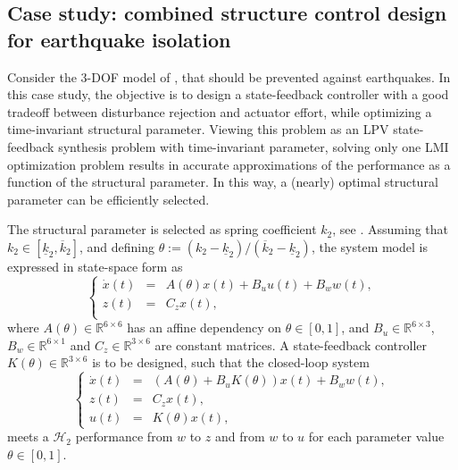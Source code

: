 \documentclass{article}
\newcommand{\ppar}{\theta}                          %
\begin{document}
\subsection{Case study: combined structure control design for earthquake isolation}
Consider the 3-DOF model of \cite{Camino_2003}, that should be prevented against earthquakes. In this case study, the objective is to design a state-feedback controller with a good tradeoff between disturbance rejection and actuator effort, while optimizing a time-invariant structural parameter. Viewing this problem as an LPV state-feedback synthesis problem with time-invariant parameter, solving only one LMI optimization problem results in accurate approximations of the performance as a function of the structural parameter. In this way, a (nearly) optimal structural parameter can be efficiently selected.

The structural parameter is selected as spring coefficient $k_2$, see \cite{Camino_2003}. Assuming that $k_2 \in [\underline{k}_2, \overline{k}_2]$, and defining $\ppar := (k_2 - \underline{k}_2)/(\overline{k}_2 - \underline{k}_2)$, the system model is expressed in state-space form as
\begin{equation*}
\left\{ \begin{array}{rcl}
	\dot{x}(t) & = & A(\ppar)x(t) + B_u u(t) + B_w w(t), \\
	z(t) & = & C_z x(t), \\
\end{array} \right.
\end{equation*}
where $A(\ppar) \in \mathbb{R}^{6 \times 6}$ has an affine dependency on $\ppar \in [0,1]$, and $B_u \in \mathbb{R}^{6 \times 3}$, $B_w \in \mathbb{R}^{6 \times 1}$ and $C_z \in \mathbb{R}^{3 \times 6}$ are constant matrices. A state-feedback controller $K(\ppar) \in \mathbb{R}^{3 \times 6}$ is to be designed, such that the closed-loop system
\begin{equation*}
\left\{ \begin{array}{rcl}
	\dot{x}(t) & = & (A(\ppar) + B_u K(\ppar))x(t) + B_w w(t), \\
	z(t) & = & C_z x(t), \\
	u(t) & = & K(\ppar) x(t),
\end{array} \right.
\end{equation*}
meets a $\mathcal{H}_2$ performance from $w$ to $z$ and from $w$ to $u$ for each parameter value $\ppar \in [0,1]$.
\end{document}
